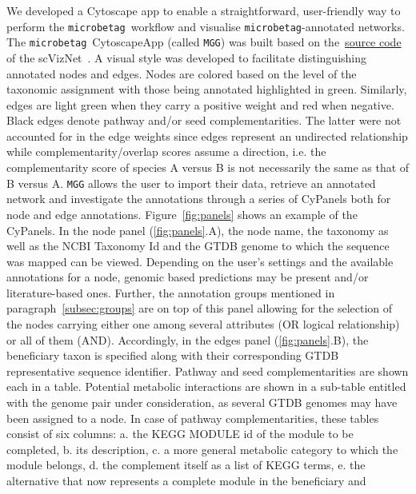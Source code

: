 \documentclass[sn-mathphys,Numbered]{sn-jnl}  %
\theoremstyle{thmstyleone}%
\theoremstyle{thmstyletwo}%
\theoremstyle{thmstylethree}%
\newcommand{\microbetag}{\texttt{microbetag}}
\begin{document}
        We developed a Cytoscape app to enable a straightforward, user-friendly way to perform the \microbetag~\space workflow and visualise \microbetag-annotated networks.
        The \microbetag~\space CytoscapeApp (called \texttt{MGG}) was built based on the~\href{https://github.com/RBVI/scNetViz}{source code} of the scVizNet~\cite{choudhary2021scnetviz}.
        A visual style was developed to facilitate distinguishing annotated nodes and edges.
        Nodes are colored based on the level of the taxonomic assignment with those being annotated highlighted in green.
        Similarly, edges are light green when they carry a positive weight and red when negative. 
        Black edges denote pathway and/or seed complementarities.
        The latter were not accounted for in the edge weights since edges represent an undirected relationship while complementarity/overlap scores assume a direction, i.e. the complementarity score of species A versus B is not necessarily the same as that of B versus A.
        \texttt{MGG} allows the user to import their data, retrieve an annotated network and investigate the annotations through a series of CyPanels both for node and edge annotations.
        Figure~\ref{fig:panels} shows an example of the CyPanels.
        In the node panel (\ref{fig:panels}.A), the node name, the taxonomy as well as the NCBI Taxonomy Id and the GTDB genome to which the sequence was mapped can be viewed. 
        Depending on the user's settings and the available annotations for a node, genomic based predictions may be present and/or literature-based ones.
        Further, the annotation groups mentioned in paragraph~\ref{subsec:groups} are on top of this panel allowing for the selection of the nodes carrying either one among several attributes (OR logical relationship) or all of them (AND).
        Accordingly, in the edges panel (\ref{fig:panels}.B), the beneficiary taxon is specified along with their corresponding GTDB representative sequence identifier.
        Pathway and seed complementarities are shown each in a table.
        Potential metabolic interactions are shown in a sub-table entitled with the genome pair under consideration, as several GTDB genomes may have been assigned to a node.
        In case of pathway complementarities, these tables consist of six columns: a. the KEGG MODULE id of the module to be completed, b. its description, 
        c. a more general metabolic category to which the module belongs,
        d. the complement itself as a list of KEGG terms, 
        e. the alternative that now represents a complete module in the beneficiary and
\end{document}
